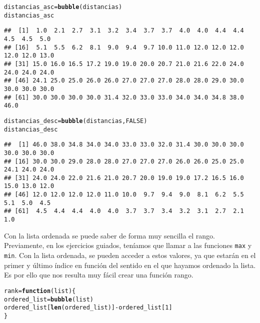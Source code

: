 \documentclass[12pt]{report}\usepackage[]{graphicx}\usepackage[dvipsnames]{xcolor}
\makeatletter
\newcommand{\hlnum}[1]{\textcolor[rgb]{0.686,0.059,0.569}{#1}}%
\newcommand{\hlopt}[1]{\textcolor[rgb]{0,0,0}{#1}}%
\newcommand{\hlstd}[1]{\textcolor[rgb]{0.345,0.345,0.345}{#1}}%
\newcommand{\hlkwa}[1]{\textcolor[rgb]{0.161,0.373,0.58}{\textbf{#1}}}%
\newcommand{\hlkwb}[1]{\textcolor[rgb]{0.69,0.353,0.396}{#1}}%
\newcommand{\hlkwc}[1]{\textcolor[rgb]{0.333,0.667,0.333}{#1}}%
\newcommand{\hlkwd}[1]{\textcolor[rgb]{0.737,0.353,0.396}{\textbf{#1}}}%
\newenvironment{kframe}{%
 \def\at@end@of@kframe{}%
 \ifinner\ifhmode%
  \def\at@end@of@kframe{\end{minipage}}%
  \begin{minipage}{\columnwidth}%
 \fi\fi%
 \def\FrameCommand##1{\hskip\@totalleftmargin \hskip-\fboxsep
 \colorbox{shadecolor}{##1}\hskip-\fboxsep
     \hskip-\linewidth \hskip-\@totalleftmargin \hskip\columnwidth}%
 \MakeFramed {\advance\hsize-\width
   \@totalleftmargin\z@ \linewidth\hsize
   \@setminipage}}%
 {\par\unskip\endMakeFramed%
 \at@end@of@kframe}
\newenvironment{knitrout}{}{} %
\makeatother
\begin{document}
\begin{knitrout}
\color{fgcolor}\begin{kframe}
\begin{alltt}
\hlstd{distancias_asc} \hlkwb{=} \hlkwd{bubble}\hlstd{(distancias)}
\hlstd{distancias_asc}
\end{alltt}
\begin{verbatim}
##  [1]  1.0  2.1  2.7  3.1  3.2  3.4  3.7  3.7  4.0  4.0  4.4  4.4  4.5  4.5  5.0
## [16]  5.1  5.5  6.2  8.1  9.0  9.4  9.7 10.0 11.0 12.0 12.0 12.0 12.0 12.0 13.0
## [31] 15.0 16.0 16.5 17.2 19.0 19.0 20.0 20.7 21.0 21.6 22.0 24.0 24.0 24.0 24.0
## [46] 24.1 25.0 25.0 26.0 26.0 27.0 27.0 27.0 28.0 28.0 29.0 30.0 30.0 30.0 30.0
## [61] 30.0 30.0 30.0 30.0 31.4 32.0 33.0 33.0 34.0 34.0 34.8 38.0 46.0
\end{verbatim}
\begin{alltt}
\hlstd{distancias_desc} \hlkwb{=} \hlkwd{bubble}\hlstd{(distancias,} \hlnum{FALSE}\hlstd{)}
\hlstd{distancias_desc}
\end{alltt}
\begin{verbatim}
##  [1] 46.0 38.0 34.8 34.0 34.0 33.0 33.0 32.0 31.4 30.0 30.0 30.0 30.0 30.0 30.0
## [16] 30.0 30.0 29.0 28.0 28.0 27.0 27.0 27.0 26.0 26.0 25.0 25.0 24.1 24.0 24.0
## [31] 24.0 24.0 22.0 21.6 21.0 20.7 20.0 19.0 19.0 17.2 16.5 16.0 15.0 13.0 12.0
## [46] 12.0 12.0 12.0 12.0 11.0 10.0  9.7  9.4  9.0  8.1  6.2  5.5  5.1  5.0  4.5
## [61]  4.5  4.4  4.4  4.0  4.0  3.7  3.7  3.4  3.2  3.1  2.7  2.1  1.0
\end{verbatim}
\end{kframe}
\end{knitrout}
			
			Con la lista ordenada se puede saber de forma muy sencilla el rango. Previamente, en los ejercicios guiados, teníamos que llamar a las funciones \texttt{max} y \texttt{min}. Con la lista ordenada, se pueden acceder a estos valores, ya que estarán en el primer y último índice en función del sentido en el que hayamos ordenado la lista. Es por ello que nos resulta muy fácil crear una función rango.
			
\begin{knitrout}
\color{fgcolor}\begin{kframe}
\begin{alltt}
\hlstd{rank} \hlkwb{=} \hlkwa{function}\hlstd{(}\hlkwc{list}\hlstd{)\{}
        \hlstd{ordered_list} \hlkwb{=} \hlkwd{bubble}\hlstd{(list)}
        \hlstd{ordered_list[}\hlkwd{len}\hlstd{(ordered_list)]} \hlopt{-} \hlstd{ordered_list[}\hlnum{1}\hlstd{]}
\hlstd{\}}
\end{alltt}
\end{kframe}
\end{knitrout}
			
\end{document}
